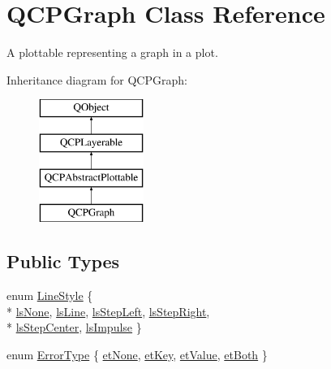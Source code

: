 \hypertarget{classQCPGraph}{}\section{Q\+C\+P\+Graph Class Reference}
\label{classQCPGraph}


A plottable representing a graph in a plot.  


Inheritance diagram for Q\+C\+P\+Graph\+:\begin{figure}[H]
\begin{center}
\leavevmode
\includegraphics[height=4.000000cm]{classQCPGraph}
\end{center}
\end{figure}
\subsection*{Public Types}
\begin{DoxyCompactItemize}
\item 
enum \hyperlink{classQCPGraph_ad60175cd9b5cac937c5ee685c32c0859}{Line\+Style} \{ \\*
\hyperlink{classQCPGraph_ad60175cd9b5cac937c5ee685c32c0859aea9591b933733cc7b20786b71e60fa04}{ls\+None}, 
\hyperlink{classQCPGraph_ad60175cd9b5cac937c5ee685c32c0859a3c42a27b15aa3c92d399082fad8b7515}{ls\+Line}, 
\hyperlink{classQCPGraph_ad60175cd9b5cac937c5ee685c32c0859ae10568bda57836487d9dec5eba1d6c6e}{ls\+Step\+Left}, 
\hyperlink{classQCPGraph_ad60175cd9b5cac937c5ee685c32c0859a9c37951f7d11aa070100fd16f2935c9e}{ls\+Step\+Right}, 
\\*
\hyperlink{classQCPGraph_ad60175cd9b5cac937c5ee685c32c0859a5adf7b04da215a40a764c21294ea7366}{ls\+Step\+Center}, 
\hyperlink{classQCPGraph_ad60175cd9b5cac937c5ee685c32c0859aa3b358b4ae7cca94aceeb8e529c12ebb}{ls\+Impulse}
 \}
\item 
enum \hyperlink{classQCPGraph_ad23b514404bd2cb3216f57c90904d6af}{Error\+Type} \{ \hyperlink{classQCPGraph_ad23b514404bd2cb3216f57c90904d6afaeae745e7cc1766bb8546e35d4b76a711}{et\+None}, 
\hyperlink{classQCPGraph_ad23b514404bd2cb3216f57c90904d6afa2a5d89cd76fb8b6b18d71b8f6f6c0f43}{et\+Key}, 
\hyperlink{classQCPGraph_ad23b514404bd2cb3216f57c90904d6afa147022ccdc49f6bd48f904cb4f61872e}{et\+Value}, 
\hyperlink{classQCPGraph_ad23b514404bd2cb3216f57c90904d6afa761cb7d61670c1e2efecccd8974409ab}{et\+Both}
 \}
\end{DoxyCompactItemize}
